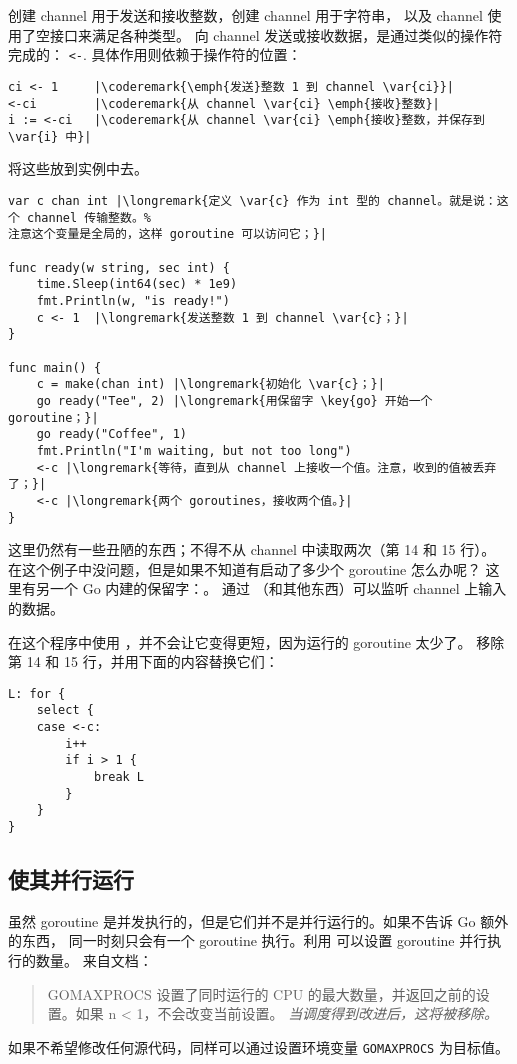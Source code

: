 创建 channel  用于发送和接收整数，创建 channel  用于字符串，
以及 channel  使用了空接口来满足各种类型。
向 channel 发送或接收数据，是通过类似的操作符完成的：
\lstinline{<-}. 
具体作用则依赖于操作符的位置：
\begin{lstlisting}
ci <- 1	    |\coderemark{\emph{发送}整数 1 到 channel \var{ci}}|
<-ci	    |\coderemark{从 channel \var{ci} \emph{接收}整数}|
i := <-ci   |\coderemark{从 channel \var{ci} \emph{接收}整数，并保存到 \var{i} 中}|
\end{lstlisting}
将这些放到实例中去。
\begin{lstlisting}[numbers=none,caption=Go routines 和 channel,label=src:sleeping with channels]
var c chan int |\longremark{定义 \var{c} 作为 int 型的 channel。就是说：这个 channel 传输整数。%
注意这个变量是全局的，这样 goroutine 可以访问它；}|

func ready(w string, sec int) {
	time.Sleep(int64(sec) * 1e9)
	fmt.Println(w, "is ready!")
	c <- 1	|\longremark{发送整数 1 到 channel \var{c}；}|
}

func main() {
	c = make(chan int) |\longremark{初始化 \var{c}；}|
	go ready("Tee", 2) |\longremark{用保留字 \key{go} 开始一个 goroutine；}|
	go ready("Coffee", 1)
	fmt.Println("I'm waiting, but not too long")
	<-c |\longremark{等待，直到从 channel 上接收一个值。注意，收到的值被丢弃了；}|
	<-c |\longremark{两个 goroutines，接收两个值。}|
}
\end{lstlisting}

\showremarks
这里仍然有一些丑陋的东西；不得不从 channel 中读取两次（第 14 和 15 行）。
在这个例子中没问题，但是如果不知道有启动了多少个 goroutine 怎么办呢？
这里有另一个 Go 内建的保留字：。
通过 （和其他东西）可以监听 channel 上输入的数据。

在这个程序中使用 ，并不会让它变得更短，因为运行的 goroutine 太少了。
移除第 14 和 15 行，并用下面的内容替换它们：
\begin{lstlisting}[caption=使用 select,numbers=right,firstnumber=14]
L: for {
	select {
	case <-c:
		i++ 
		if i > 1 { 
			break L
		}   
	}   
}   
\end{lstlisting}

\subsection{使其并行运行}
虽然 goroutine 是并发执行的，但是它们并不是并行运行的。如果不告诉 Go 额外的东西，
同一时刻只会有一个 goroutine 执行。利用  可以设置 goroutine 并行执行的数量。
来自文档：
\begin{quote}
GOMAXPROCS 设置了同时运行的 CPU 的最大数量，并返回之前的设置。如果 n < 1，不会改变当前设置。
\emph{当调度得到改进后，这将被移除。}
\end{quote}
如果不希望修改任何源代码，同样可以通过设置环境变量
 \verb|GOMAXPROCS| 为目标值。

